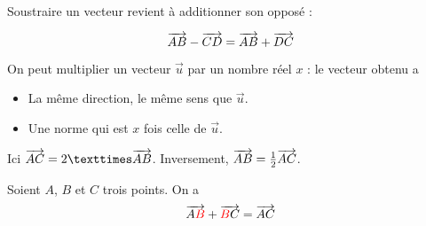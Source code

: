 \documentclass[
	classe=$2^{de}$,
	headerTitle=Généralités\space sur\space les\space vecteurs
]{coursclass}
\begin{document}
\begin{definition}
	Soustraire un vecteur revient à additionner son opposé :

	$$ \overrightarrow{AB} - \overrightarrow{CD} = \overrightarrow{AB} + \overrightarrow{DC} $$
\end{definition}

\begin{definition}
	On peut multiplier un vecteur $\vec{u}$ par un nombre réel $x$ : le vecteur obtenu a
	\begin{itemize}
		\item La même direction, le même sens que $\vec{u}$.
		\item Une norme qui est $x$ fois celle de $\vec{u}$.
	\end{itemize}
\end{definition}

\begin{exemple}
	\begin{center}
	\end{center}
	
	Ici $\widevec{AC} = 2 × \widevec{AB}$. Inversement, $\overrightarrow{AB} = \frac{1}{2}\overrightarrow{AC}$.
\end{exemple}

\begin{propriete}
	Soient $A$, $B$ et $C$ trois points. On a
	$$ \overrightarrow{A{\color{red}B}} + \overrightarrow{{\color{red}B}C} = \overrightarrow{AC} $$
\end{propriete}
\end{document}
